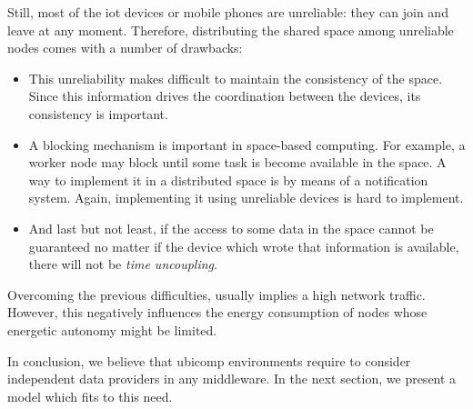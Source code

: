 Still, most of the \ac{iot} devices or mobile phones are unreliable: they can join and leave at any moment.
Therefore, distributing the shared space among unreliable nodes comes with a number of drawbacks:
\begin{itemize}
  \item This unreliability makes difficult to maintain the consistency of the space. %
        Since this information drives the coordination between the devices, its consistency is important.
  \item A blocking mechanism is important in space-based computing.
        For example, a worker node may block until some task is become available in the space.
        A way to implement it in a distributed space is by means of a notification system.
        Again, implementing it using unreliable devices is hard to implement. %
  \item And last but not least, if the access to some data in the space cannot be guaranteed no matter if the device which wrote that information is available, there will not be \emph{time uncoupling}.
\end{itemize}
Overcoming the previous difficulties, usually implies a high network traffic.
However, this negatively influences the energy consumption of nodes whose energetic autonomy might be limited.


In conclusion, we believe that \ac{ubicomp} environments require to consider independent data providers in any middleware.
In the next section, we present a model which fits to this need.